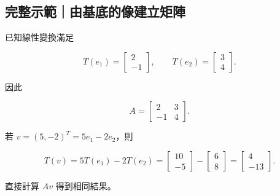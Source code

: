 \documentclass[11pt,a4paper]{article}
\begin{document}
\begin{HandoutWorkedExample}

\subsection{完整示範｜由基底的像建立矩陣}\label{ux5b8cux6574ux793aux7bc4ux7531ux57faux5e95ux7684ux50cfux5efaux7acbux77e9ux9663}

已知線性變換滿足

\[
T(e_1)=\begin{bmatrix}2\\-1\end{bmatrix},
\qquad
T(e_2)=\begin{bmatrix}3\\4\end{bmatrix}.
\]

因此

\[
A=\boxed{\begin{bmatrix}2&3\\-1&4\end{bmatrix}}.
\]

若 \(v=(5,-2)^T=5e_1-2e_2\)，則

\[
T(v)=5T(e_1)-2T(e_2)
=
\begin{bmatrix}10\\-5\end{bmatrix}
-
\begin{bmatrix}6\\8\end{bmatrix}
=\boxed{\begin{bmatrix}4\\-13\end{bmatrix}}.
\]

直接計算 \(Av\) 得到相同結果。

\end{HandoutWorkedExample}
\end{document}
